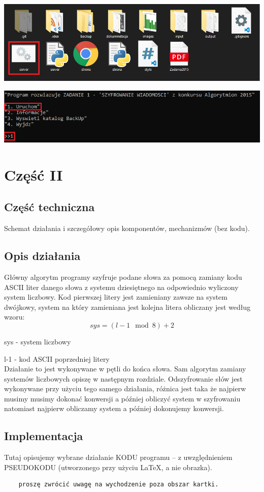 \documentclass[12pt,a4paper]{article}
\begin{document}
			\includegraphics[scale=0.7]{instrukcja}

			\includegraphics[scale=0.8]{instrukcja2}
	
	
\newpage
	\section*{Część II}
	\subsection*{Część techniczna}
	Schemat działania i szczegółowy opis komponentów, mechanizmów (bez kodu).
	\subsection*{Opis działania} 
Główny algorytm programy szyfruje podane słowa za pomocą zamiany kodu ASCII liter danego słowa z systemu dziesiętnego na odpowiednio wyliczony system liczbowy. Kod pierwszej litery jest zamieniany zawsze na system dwójkowy, system na który zamieniana jest kolejna litera obliczany jest według wzoru: $$sys=(l-1\mod{8})+2$$ 


sys - system liczbowy


l-1 - kod ASCII poprzedniej litery \\

Działanie to jest wykonywane w pętli do końca słowa. Sam algorytm zamiany systemów liczbowych opiszę w następnym rozdziale. Odszyfrowanie słów jest wykonywane przy użyciu tego samego działania, różnica jest taka że najpierw musimy musimy dokonać konwersji a później obliczyć system w szyfrowaniu natomiast najpierw obliczamy system a później dokonujemy konwersji. 
	\subsection*{Implementacja}
	Tutaj opisujemy wybrane działanie KODU programu -- z uwzględnieniem PSEUDOKODU (utworzonego przy użyciu \LaTeX, a nie obrazka).
	\begin{verbatim}
	proszę zwrócić uwagę na wychodzenie poza obszar kartki.
	\end{verbatim}
	\newpage
\end{document}
